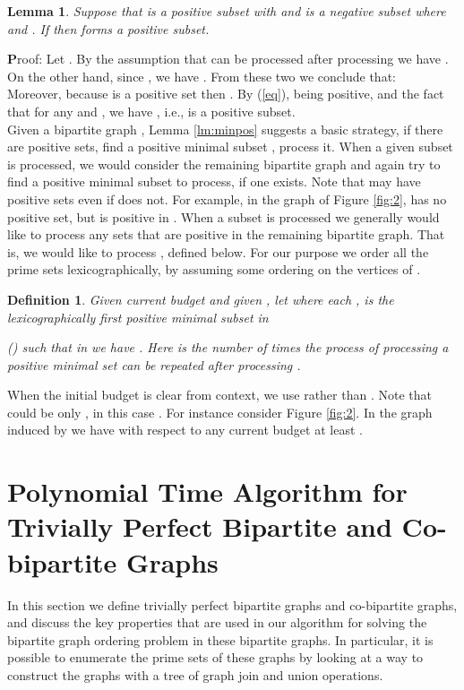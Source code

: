 \documentclass[letterpaper,11pt,abstracton]{scrartcl}
\newcommand{\qed}{\hfill}
\newcommand{\pf}{{\textbf Proof: }}
\newtheorem{lemma}[theorem]{Lemma}
\newtheorem{dfn}[theorem]{Definition}
\begin{document}
\begin{lemma}\label{correctness}
Suppose that  is a positive subset with 
and  is a negative subset where  and .
If  then  forms a positive subset.
\end{lemma}
\pf Let . By the assumption that  can be processed after processing
 we have . On the other hand, since , we have
. From these two we conclude that:\\


Moreover, because  is a positive set then .
By (\ref{eq}),  being positive, and the fact that
 for any  and , we have
, i.e.,  is a positive subset.
\qed \\


Given a bipartite graph , Lemma \ref{lm:minpos} suggests a basic strategy,
if there are positive sets, find a positive minimal subset , process it.  When a given subset  is processed, we
would consider the remaining bipartite graph and again try to find a positive
minimal subset to process, if one exists. Note that
 may have positive sets even if  does not.
For example, in the graph of Figure \ref{fig:2},
 has no positive set,
but  is positive in .  When a
subset  is processed we generally would like to process
any sets that are positive in the remaining bipartite graph.  That is,
we would like to process , defined below.
For our purpose we order all the prime sets lexicographically, by assuming some ordering on the vertices of .

\begin{dfn}\label{def:closure}
  Given current budget  and given , let  where each ,
   is the lexicographically first
   positive minimal subset in
   
   () such that in  we have .  Here  is the number of times the process of processing a positive minimal
set can be repeated after processing .
\end{dfn}
When the initial budget  is clear from context, we use  rather than .
Note that  could be only , in this case . For instance consider Figure \ref{fig:2}. In the graph induced by  we have  with respect to any current budget  at least .




\section{Polynomial Time Algorithm for Trivially Perfect Bipartite and Co-bipartite Graphs}\label{sec:poly-TP-CB}

In this section we define trivially perfect bipartite graphs and co-bipartite graphs,
and discuss the key properties that are used in our algorithm for solving
the bipartite graph ordering problem in these bipartite graphs.  In particular, it is
possible to enumerate the prime sets of these graphs by looking at a way
to construct the graphs with a tree of graph join and union operations.
\end{document}
